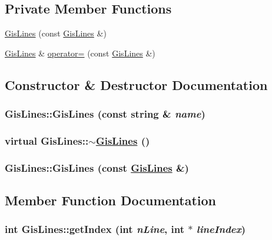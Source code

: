 \subsection*{Private Member Functions}
\begin{CompactItemize}
\item 
\hyperlink{classGisLines_d0}{Gis\-Lines} (const \hyperlink{classGisLines}{Gis\-Lines} \&)
\item 
\hyperlink{classGisLines}{Gis\-Lines} \& \hyperlink{classGisLines_d1}{operator=} (const \hyperlink{classGisLines}{Gis\-Lines} \&)
\end{CompactItemize}


\subsection{Constructor \& Destructor Documentation}
\hypertarget{classGisLines_a0}{
\subsubsection[GisLines]{\setlength{\rightskip}{0pt plus 5cm}Gis\-Lines::Gis\-Lines (const string \& {\em name})}}
\label{classGisLines_a0}


\hypertarget{classGisLines_a1}{
\subsubsection[$\sim$GisLines]{\setlength{\rightskip}{0pt plus 5cm}virtual Gis\-Lines::$\sim$\hyperlink{classGisLines}{Gis\-Lines} ()}}
\label{classGisLines_a1}


\hypertarget{classGisLines_d0}{
\subsubsection[GisLines]{\setlength{\rightskip}{0pt plus 5cm}Gis\-Lines::Gis\-Lines (const \hyperlink{classGisLines}{Gis\-Lines} \&)}}
\label{classGisLines_d0}




\subsection{Member Function Documentation}
\hypertarget{classGisLines_a6}{
\subsubsection[getIndex]{\setlength{\rightskip}{0pt plus 5cm}int Gis\-Lines::get\-Index (int {\em n\-Line}, int $\ast$ {\em line\-Index})}}
\label{classGisLines_a6}


